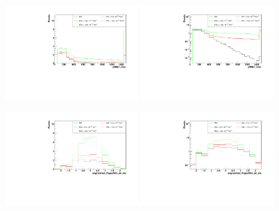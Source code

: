 \begin{figure}[h]
  \begin{center}
	\includegraphics[width=0.45\textwidth]{Plots/aQGC_kinematics/pfMET_Corr_FT2.pdf}%
	\includegraphics[width=0.45\textwidth]{Plots/aQGC_kinematics/pfMET_Corr_FT2_log.pdf}\\				
    \caption{}
  \end{center}
\end{figure}
\begin{figure}[h]
  \begin{center}
	\includegraphics[width=0.45\textwidth]{Plots/aQGC_kinematics/ungroomed_PuppiAK8_jet_eta_FM0.pdf}%
	\includegraphics[width=0.45\textwidth]{Plots/aQGC_kinematics/ungroomed_PuppiAK8_jet_eta_FM0_log.pdf}\\		
    \caption{}
  \end{center}
\end{figure}

